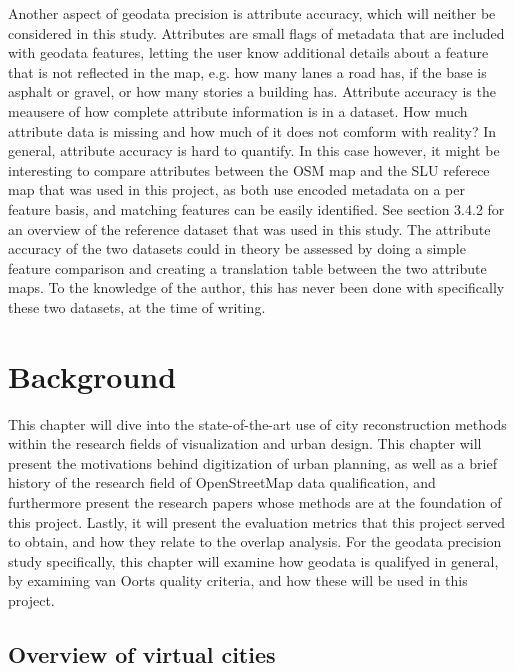 \documentclass{kththesis}
\begin{document}
Another aspect of geodata precision is attribute accuracy, which will neither be considered in this study.
Attributes are small flags of metadata that are included with geodata features, letting the user know additional details about a feature that is not reflected in the map, e.g. how many lanes a road has, if the base is asphalt or gravel, or how many stories a building has.
Attribute accuracy is the meausere of how complete attribute information is in a dataset.
How much attribute data is missing and how much of it does not comform with reality?
In general, attribute accuracy is hard to quantify.
In this case however, it might be interesting to compare attributes between the OSM map and the SLU referece map that was used in this project, as both use encoded metadata on a per feature basis, and matching features can be easily identified.
See section 3.4.2 for an overview of the reference dataset that was used in this study.
The attribute accuracy of the two datasets could in theory be assessed by doing a simple feature comparison and creating a translation table between the two attribute maps.
To the knowledge of the author, this has never been done with specifically these two datasets, at the time of writing.

\chapter{Background}

This chapter will dive into the state-of-the-art use of city reconstruction methods within the research fields of visualization and urban design.
This chapter will present the motivations behind digitization of urban planning, as well as a brief history of the research field of OpenStreetMap data qualification, and furthermore present the research papers whose methods are at the foundation of this project.
Lastly, it will present the evaluation metrics that this project served to obtain, and how they relate to the overlap analysis.
For the geodata precision study specifically, this chapter will examine how geodata is qualifyed in general, by examining van Oorts quality criteria, and how these will be used in this project.

\section{Overview of virtual cities}
\end{document}
